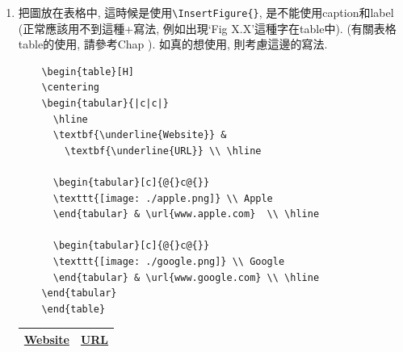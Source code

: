 \begin{enumerate}
{  } %

  \newpage
  \item
  {
    把圖放在表格中, 這時候是使用\verb|\InsertFigure{}|, 是不能使用caption和label (正常應該用不到這種+寫法, 例如出現`Fig X.X'這種字在table中). (有關表格table的使用, 請參考Chap ). 如真的想使用, 則考慮這邊的寫法.

    \begin{verbatim}
    \begin{table}[H]
    \centering
    \begin{tabular}{|c|c|}
      \hline
      \textbf{\underline{Website}} &
        \textbf{\underline{URL}} \\ \hline

      \begin{tabular}[c]{@{}c@{}}
      \texttt{[image: ./apple.png]} \\ Apple
      \end{tabular} & \url{www.apple.com}  \\ \hline

      \begin{tabular}[c]{@{}c@{}}
      \texttt{[image: ./google.png]} \\ Google
      \end{tabular} & \url{www.google.com} \\ \hline
    \end{tabular}
    \end{table}
    \end{verbatim}

    \begin{table}[H]
    \centering
    \label{table:how-to:write:figure:insert-figure-into-table}
    \begin{tabular}{|c|c|}
      \hline
      \textbf{\underline{Website}} &
        \textbf{\underline{URL}} \\ \hline


\end{tabular}
\end{table}}
\end{enumerate}
